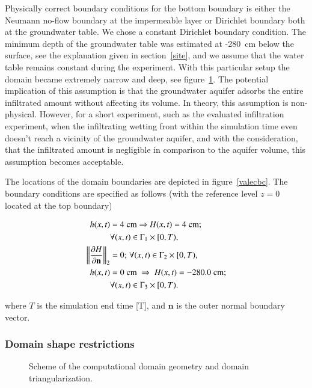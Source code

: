 \documentclass[review,times,3p,10pt]{elsarticle}
\newenvironment{lineq}
    {\begin{linenomath*}
    \begin{equation}
    }
    { 
    \end{equation} 
    \end{linenomath*}
    }
\renewcommand{\vec}{\mathbf}
\begin{document}
{Physically correct boundary conditions for the bottom boundary is either the Neumann no-flow boundary at the impermeable layer or Dirichlet boundary both at the groundwater table. We chose a constant Dirichlet boundary condition. {The minimum depth} of the groundwater table was estimated at -280~cm below the surface, {see the explanation given in section~\ref{site},} and  we assume that the water table remains constant during the experiment. With this particular setup the domain became extremely narrow and deep, see figure~\ref{valec}.{  The potential implication of this assumption is that the groundwater aquifer adsorbs the entire infiltrated amount without affecting its volume. In theory, this assumption is non-physical. However, for a short  experiment, such as the evaluated infiltration experiment, when the infiltrating wetting front within the simulation time even doesn't reach a vicinity of the groundwater aquifer, and  with the consideration, that the infiltrated amount is  negligible in comparison to the   aquifer volume, this assumption becomes acceptable.}





The locations of the domain boundaries are depicted in figure~\ref{valecbc}. The boundary conditions are specified as follows (with the reference level $z=0$ located at the top boundary)
{\begin{lineq} 
\label{bccond}
\begin{split}
h(x,t) &= 4 \; \mbox{cm} \Rightarrow H(x,t) = 4 \; \mbox{cm}; \\ &\forall (x,t) \in \Gamma_1 \times [0,T), \\
\norm{\frac{\partial H}{\partial \vec{n}}}_2 &= 0; \, \forall (x,t) \in \Gamma_2 \times [0,T), \\
h(x,t) &= 0  \; \mbox{cm}  \; \Rightarrow \; H(x,t) = -280.0  \; \mbox{cm}; \\ &\forall (x,t) \in \Gamma_3 \times [0,T).
\end{split}
\end{lineq}}
where $T$ is the simulation end time [T], and $\vec{n}$ is the outer normal boundary vector.

\subsubsection{Domain shape restrictions}
\label{shaperestr}

 \begin{figure}
\centering
{}
 \caption{Scheme of the computational domain geometry and domain triangularization.}
 \label{valec}
\end{figure}


}
\end{document}
